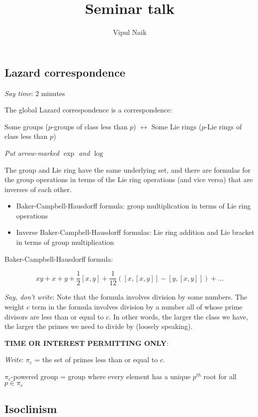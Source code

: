\documentclass[10pt]{amsart}
\title{Seminar talk}
\author{Vipul Naik}
\begin{document}
\maketitle

\subsection{Lazard correspondence}

{\em Say time}: 2 minutes

The global Lazard correspondence is a correspondence:

Some groups ($p$-groups of class less than $p$) $\leftrightarrow$ Some
Lie rings ($p$-Lie rings of class less than $p$)

{\em Put arrow-marked $\exp$ and $\log$}

The group and Lie ring have the same underlying set, and there are
formulas for the group operations in terms of the Lie ring operations
(and vice versa) that are inverses of each other.

\begin{itemize}
\item Baker-Campbell-Hausdorff formula: group multiplication in terms
  of Lie ring operations
\item Inverse Baker-Campbell-Hausdorff formulas: Lie ring addition and
  Lie bracket in terms of group multiplication
\end{itemize}

Baker-Campbell-Hausdorff formula:

$$xy + x + y + \frac{1}{2}[x,y] + \frac{1}{12}([x,[x,y]] - [y,[x,y]]) + \dots$$

{\em Say, don't write}: Note that the formula involves division by
some numbers. The weight $c$ term in the formula involves division by
a number all of whose prime divisors are less than or equal to $c$. In
other words, the larger the class we have, the larger the primes we
need to divide by (loosely speaking).

{\bf TIME OR INTEREST PERMITTING ONLY}:

{\em Write}: $\pi_c$ = the set of primes less than or equal to $c$.

$\pi_c$-powered group = group where every element has a unique
$p^{th}$ root for all $p \in \pi_c$

\subsection{Isoclinism}
\end{document}
